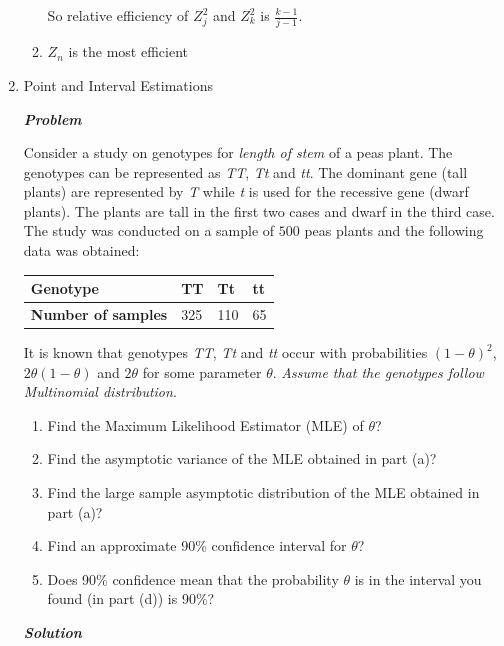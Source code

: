 \documentclass[12pt, oneside]{article}
\begin{document}
\begin{enumerate}
\begin{enumerate}
    So relative efficiency of $Z^2_j$ and $Z^2_k$ is $\frac{k-1}{j-1}$.
    
    \item $Z_n$ is the most efficient 
    
\end{enumerate}


\item	Point and Interval Estimations

\textit{\textbf{Problem}}


Consider a study on genotypes for \textit{length of stem} of a peas plant. The genotypes can be represented as \textit{TT}, \textit{Tt} and \textit{tt}. The dominant gene (tall plants) are represented by \textit{T} while \textit{t} is used for the recessive gene (dwarf plants). The plants are tall in the first two cases and dwarf in the third case. The study was conducted on a sample of $500$ peas plants and the following data was obtained:

\begin{tabular}{l|l|l|l}
     \textbf{Genotype} & TT & Tt & tt  \\ \hline 
     \textbf{Number of samples} & 325 & 110 & 65 \\
\end{tabular}

It is known that genotypes \textit{TT}, \textit{Tt} and \textit{tt} occur with probabilities $(1 - \theta)^2$, $2\theta(1 - \theta)$ and $2\theta$ for some parameter $\theta$. \textit{Assume that the genotypes follow Multinomial distribution}.

\begin{enumerate}
    \item Find the Maximum Likelihood Estimator (MLE) of $\theta$?
    \item Find the asymptotic variance of the MLE obtained in part (a)?
    \item Find the large sample asymptotic distribution of the MLE obtained in part (a)?
    \item  Find an approximate 90\% confidence interval for $\theta$?
   \item Does 90\% confidence mean that the probability $\theta$ is in the interval you found (in part (d)) is 90\%?
\end{enumerate}

\textit{\textbf{Solution}}


\end{enumerate}
\end{document}
